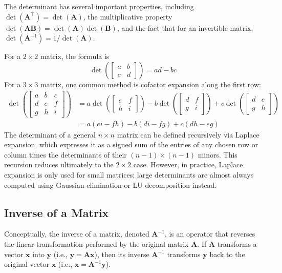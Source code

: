 The determinant has several important properties, including $ \det(\mathbf{A}^\top) = \det(\mathbf{A}) $, the multiplicative property $ \det(\mathbf{AB}) = \det(\mathbf{A})\det(\mathbf{B}) $, and the fact that for an invertible matrix, $ \det(\mathbf{A}^{-1}) = 1 / \det(\mathbf{A}) $.

For a $2\times 2$ matrix, the formula is
\begin{equation*}
    \det\!\left(\begin{bmatrix} a & b \\ c & d \end{bmatrix}\right) = ad - bc
\end{equation*}
For a $3\times 3$ matrix, one common method is cofactor expansion along the first row:
\begin{align*}
    \det\!\left(\begin{bmatrix} a & b & c \\ d & e & f \\ g & h & i \end{bmatrix}\right) &= a \det\!\left(\begin{bmatrix} e & f \\ h & i \end{bmatrix}\right) - b \det\!\left(\begin{bmatrix} d & f \\ g & i \end{bmatrix}\right) + c \det\!\left(\begin{bmatrix} d & e \\ g & h \end{bmatrix}\right) \\ &= a(ei - fh) - b(di - fg) + c(dh - eg)
\end{align*}
The determinant of a general $n \times n$ matrix can be defined recursively via Laplace expansion, which expresses it as a signed sum of the entries of any chosen row or column times the determinants of their $(n-1) \times (n-1)$ minors. This recursion reduces ultimately to the $2 \times 2$ case. However, in practice, Laplace expansion is only used for small matrices; large determinants are almost always computed using Gaussian elimination or LU decomposition instead.


\subsection{Inverse of a Matrix}
Conceptually, the inverse of a matrix, denoted $ \mathbf{A}^{-1} $, is an operator that reverses the linear transformation performed by the original matrix $ \mathbf{A} $. If $ \mathbf{A} $ transforms a vector $ \mathbf{x} $ into $ \mathbf{y} $ (i.e., $ \mathbf{y} = \mathbf{A}\mathbf{x} $), then its inverse $ \mathbf{A}^{-1} $ transforms $ \mathbf{y} $ back to the original vector $ \mathbf{x} $ (i.e., $ \mathbf{x} = \mathbf{A}^{-1}\mathbf{y} $).


